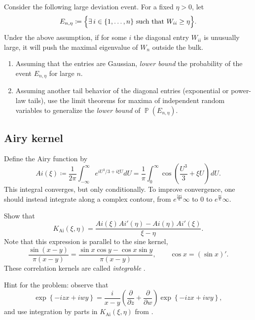 \documentclass[letterpaper,11pt,oneside,reqno]{article}
\numberwithin{equation}{section}
\newcommand{\ssp}{\hspace{1pt}}
\theoremstyle{definition}
\begin{document}
\medskip

Consider the following large deviation event. For a fixed \(\eta>0\), let
\[
E_{n,\eta}\coloneqq \Bigl\{ \exists\, i\in\{1,\dots,n\} \text{ such that } W_{ii}\ge \eta \Bigr\}.
\]
Under the above assumption, if for some \(i\) the diagonal
entry \(W_{ii}\) is unusually large, it will push the
maximal eigenvalue of \(W_n\) outside the bulk.

\begin{enumerate}
	\item Assuming that the
		entries are Gaussian,
		\emph{lower bound} the probability of the event \(E_{n,\eta}\) for large \(n\).
	\item
		Assuming another tail behavior of the diagonal entries (exponential or
		power-law tails),
		use the limit theorems for maxima of independent random variables to generalize the
		\emph{lower bound} of $\operatorname{\mathbb{P}}(E_{n,\eta})$.
\end{enumerate}



\subsection{Airy kernel}
\label{prob:airy}

Define the Airy function by
\begin{equation*}
	Ai(\xi)\coloneqq
	\frac{1}{2\pi}\int_{-\infty}^\infty
	e^{i U^3/3+i\xi U} dU=
	\frac{1}{\pi}\int_0^\infty
	\cos\left( \frac{U^3}{3}+\xi U \right)\ssp dU.
\end{equation*}
This integral converges, but only conditionally. To improve convergence,
one should instead integrate
along a complex contour,
from $e^{\frac{5 \pi i}{6}}\infty$ to $0$ to
$e^{\frac{\pi i}{6}}\infty$.

Show that
\begin{equation*}
	K_{\mathrm{Ai}}(\xi,\eta)=
	\frac{Ai(\xi)\ssp Ai'(\eta)-Ai(\eta)\ssp Ai'(\xi)}{\xi-\eta}.
\end{equation*}
Note that this expression is parallel to the sine kernel,
\begin{equation*}
	\frac{\sin(x-y)}{\pi(x-y)}=\frac{\sin x\cos y-\cos x\sin y}{\pi(x-y)},\qquad
	\cos x=(\sin x)'.
\end{equation*}
These correlation kernels are called \emph{integrable}
\cite{its1990differential}.

Hint for the problem: observe that
\begin{equation*}
	\exp\left\{ -i z x+iwy \right\}=\frac{i}{x-y}\left( \frac{\partial}{\partial z}+
	\frac{\partial}{\partial w}\right)\exp\left\{ -i z x+iwy \right\},
\end{equation*}
and use integration by parts in $K_{\mathrm{Ai}}(\xi,\eta)$
from .
\end{document}
